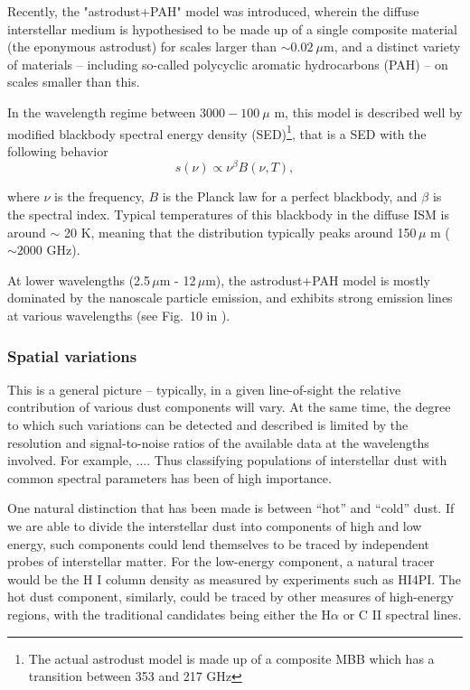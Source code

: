 \documentclass{aa}
\begin{document}
Recently, the "astrodust+PAH" model \citep{Hensley2023} was introduced, wherein
the diffuse interstellar medium is hypothesised to be made up of a single
composite material (the eponymous astrodust) for scales larger than
$\sim0.02~\mu$m, and a distinct variety of materials -- including so-called
polycyclic aromatic hydrocarbons (PAH) -- on scales smaller than this.

In the wavelength regime between $3000-100~\mu$ m, this model is described well
 by modified blackbody spectral energy density (SED)\footnote{The actual
 astrodust model is made up of a composite MBB which has a transition between
353 and 217 GHz}, that is a SED with the following behavior
\begin{equation}
s(\nu) \propto \nu^\beta B(\nu, T),
\label{eq:mbb}
\end{equation}

where $\nu$ is the frequency, $B$ is the Planck law for a perfect blackbody,
and $\beta$ is the spectral index. Typical temperatures of this blackbody in
the diffuse ISM is around $\sim$ 20 K, meaning that the distribution typically
peaks around 150\,$\mu$ m ($\sim 2000$ GHz).

At lower wavelengths (2.5\,$\mu$m - 12\,$\mu$m), the astrodust+PAH model is
mostly dominated by the nanoscale particle emission, and exhibits strong
emission lines at various wavelengths (see Fig.~10 in \cite{Hensley2023}).

\subsubsection{Spatial variations}
This is a general picture -- typically, in a given line-of-sight the relative
contribution of various dust components will vary. At the same time, the degree
to which such variations can be detected and described is limited by the
resolution and signal-to-noise ratios of the available data at the wavelengths
involved. For example, .... Thus classifying populations of interstellar dust
with common spectral parameters has been of high importance.

One natural distinction that has been made is between ``hot'' and ``cold''
dust. If we are able to divide the interstellar dust into components of high
and low energy, such components could lend themselves to be traced by
independent probes of interstellar matter. For the low-energy component, a
natural tracer would be the H I column density as measured by experiments such
as HI4PI. The hot dust component, similarly, could be traced by other measures
of high-energy regions, with the traditional candidates being either the
H$\alpha$ or C II spectral lines.
\end{document}
